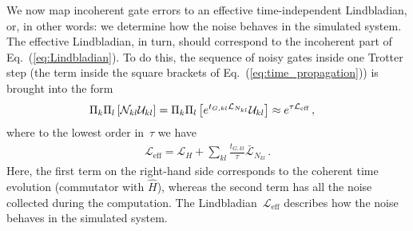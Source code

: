 \documentclass[twocolumn,amsmath,amssymb,pra]{revtex4-2}
\begin{document}
We now map incoherent gate errors to an effective time-independent Lindbladian, or, 
in other words: we determine how the noise behaves in the simulated system.
The effective Lindbladian, in turn, should correspond 
to the incoherent part of Eq.~(\ref{eq:Lindbladian}).
To do this,
the sequence of noisy gates inside one Trotter step (the term inside the square brackets of Eq.~(\ref{eq:time_propagation})) is brought into the form
\begin{align}\label{eq:noise_mapping_derivation}
\Pi_k\Pi_l \left[{\cal N}_{kl} {\cal U}_{kl}\right] &= \Pi_k\Pi_l \left[e^{t_{G,kl} \mathcal{L}_{N_{kl}}}{\cal U}_{kl}\right]\approx e^{\tau \mathcal{L}_\textrm{eff}} \, ,
\end{align}
where
to the lowest order in~$\tau$ 
we have~\cite{Fratus2022}
\begin{align}\label{eq:noise_mapping_result}
\mathcal{L}_{\text{eff}} = \mathcal{L}_{H} + \sum_{kl} \frac{t_{G,kl}}{\tau} \bar{\mathcal{L}}_{N_{kl}} \, .
\end{align}
Here, the first term on the right-hand side
corresponds to the coherent time evolution (commutator with $\hat H$),
whereas the second term has all the noise collected during the computation.
The Lindbladian~$\mathcal{L}_{\text{eff}}$ describes how the noise behaves in the simulated system.
\end{document}
